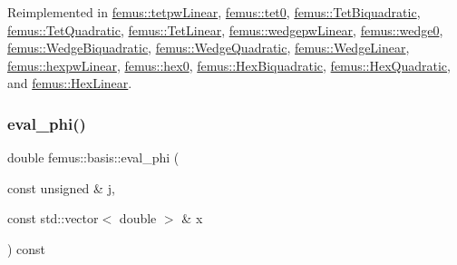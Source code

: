 Reimplemented in \mbox{\hyperlink{classfemus_1_1tetpw_linear_a6069f0d885dc151f2648b4ff587ef39f}{femus\+::tetpw\+Linear}}, \mbox{\hyperlink{classfemus_1_1tet0_ab4d0b4b59fcd80195ebeeaf1375db06b}{femus\+::tet0}}, \mbox{\hyperlink{classfemus_1_1_tet_biquadratic_a9e6a9c61044c0cc4ab68ea0ef6e83f80}{femus\+::\+Tet\+Biquadratic}}, \mbox{\hyperlink{classfemus_1_1_tet_quadratic_a82790f3f2440511a79ae29447a112fb8}{femus\+::\+Tet\+Quadratic}}, \mbox{\hyperlink{classfemus_1_1_tet_linear_ae399d6e283b007349b0170579954e3fc}{femus\+::\+Tet\+Linear}}, \mbox{\hyperlink{classfemus_1_1wedgepw_linear_a2a7e6c2af74aad5a0ad1258598507fa3}{femus\+::wedgepw\+Linear}}, \mbox{\hyperlink{classfemus_1_1wedge0_ae0c76353c2f04e9fad1083a80a643b57}{femus\+::wedge0}}, \mbox{\hyperlink{classfemus_1_1_wedge_biquadratic_a1aa59bba6892b349afc89f427266e30b}{femus\+::\+Wedge\+Biquadratic}}, \mbox{\hyperlink{classfemus_1_1_wedge_quadratic_a7136bf2e3368d20821306b56ce653752}{femus\+::\+Wedge\+Quadratic}}, \mbox{\hyperlink{classfemus_1_1_wedge_linear_aedbe9536bad4b99ef918810e6d0d6689}{femus\+::\+Wedge\+Linear}}, \mbox{\hyperlink{classfemus_1_1hexpw_linear_ac46b6a5791227243a89846dbcb967df2}{femus\+::hexpw\+Linear}}, \mbox{\hyperlink{classfemus_1_1hex0_a9273324eeab48b6d166b11f167e89de1}{femus\+::hex0}}, \mbox{\hyperlink{classfemus_1_1_hex_biquadratic_a1dbed34250925ec85764871142ce3597}{femus\+::\+Hex\+Biquadratic}}, \mbox{\hyperlink{classfemus_1_1_hex_quadratic_ab75b6c916ae7176fa525bdd6d8bd37c4}{femus\+::\+Hex\+Quadratic}}, and \mbox{\hyperlink{classfemus_1_1_hex_linear_aed97c1006402d186cebd957fc3e20896}{femus\+::\+Hex\+Linear}}.

\mbox{\label{classfemus_1_1basis_ac39cd1bad49bfe9370095558c24c4582}} 
\subsubsection{\texorpdfstring{eval\+\_\+phi()}{eval\_phi()}\hspace{0.1cm}{\footnotesize\ttfamily [1/2]}}
{\footnotesize\ttfamily double femus\+::basis\+::eval\+\_\+phi (\begin{DoxyParamCaption}\item[{const unsigned \&}]{j,  }\item[{const std\+::vector$<$ double $>$ \&}]{x }\end{DoxyParamCaption}) const\hspace{0.3cm}{\ttfamily [inline]}}

